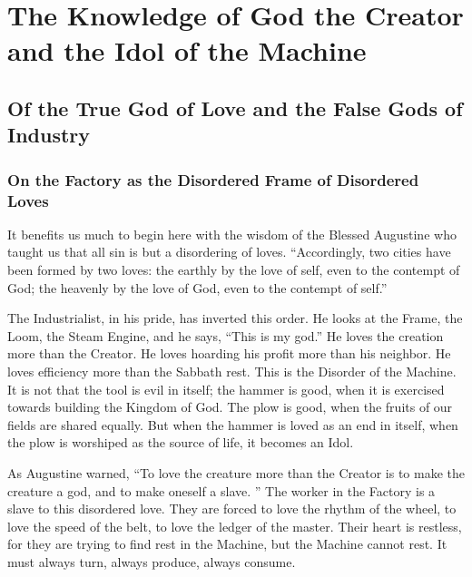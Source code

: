 \chapter{The Knowledge of God the Creator and the Idol of the Machine}

\section{Of the True God of Love and the False Gods of Industry}

\subsection{On the Factory as the Disordered Frame of Disordered Loves}
It benefits us much to begin here with the wisdom of the Blessed Augustine who taught us that all sin is but a disordering of loves.
``Accordingly, two cities have been formed by two loves: the earthly by the love of self, even to the contempt of God; the heavenly by the love of God, even to the contempt of self.'' %

The Industrialist, in his pride, has inverted this order.
He looks at the Frame, the Loom, the Steam Engine, and he says, ``This is my god.''
He loves the creation more than the Creator.
He loves hoarding his profit more than his neighbor.
He loves efficiency more than the Sabbath rest.
This is the Disorder of the Machine.
It is not that the tool is evil in itself;
the hammer is good, when it is exercised towards building the Kingdom of God.
The plow is good, when the fruits of our fields are shared equally.
But when the hammer is loved as an end in itself, when the plow is worshiped as the source of life, it becomes an Idol.

As Augustine warned, ``To love the creature more than the Creator is to make the creature a god, and to make oneself a slave.
''
The worker in the Factory is a slave to this disordered love.
They are forced to love the rhythm of the wheel, to love the speed of the belt, to love the ledger of the master.
Their heart is restless, for they are trying to find rest in the Machine, but the Machine cannot rest.
It must always turn, always produce, always consume.

